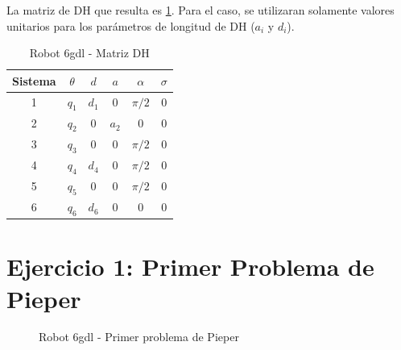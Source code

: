 \documentclass[a4paper,12pt]{article}
\begin{document}
La matriz de DH que resulta es \cref{matriz DH}. Para el caso, se utilizaran solamente
valores unitarios para los parámetros de longitud de DH ($a_i$ y $d_i$).

\begin{table}[H]
    \centering
    \begin{tabular}{|c|c|c|c|c|c|}
    \hline
    Sistema & $\theta$  & $d$        & $a$    & $\alpha$  & $\sigma$ \\ \hline
    1       & $q_1$     & $d_1$      & $0$    & $\pi/2$   & 0        \\ \hline
    2       & $q_2$     & $0$        & $a_2$  & $0$       & 0        \\ \hline
    3       & $q_3$     & $0$        & $0$    & $\pi/2$   & 0        \\ \hline
    4       & $q_4$     & $d_4$      & $0$    & $\pi/2$   & 0        \\ \hline
    5       & $q_5$     & $0$        & $0$    & $\pi/2$   & 0        \\ \hline
    6       & $q_6$     & $d_6$      & $0$    & $0$       & 0        \\ \hline
    \end{tabular}
    \caption{Robot 6gdl - Matriz DH}
    \label{matriz DH}
\end{table}

\section{Ejercicio 1: Primer Problema de Pieper}
\begin{figure}[H]
    \centering
    \begin{adjustbox}{scale = 0.55, max width=\columnwidth}
    \end{adjustbox}
    \caption{Robot 6gdl - Primer problema de Pieper}
    \label{primer problema pieper}
\end{figure}
\end{document}
